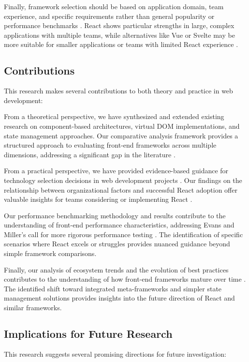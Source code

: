 Finally, framework selection should be based on application domain, team experience, and specific requirements rather than general popularity or performance benchmarks \cite{gartner2022}. React shows particular strengths in large, complex applications with multiple teams, while alternatives like Vue or Svelte may be more suitable for smaller applications or teams with limited React experience \cite{hassan2019}.

\subsection{Contributions}
This research makes several contributions to both theory and practice in web development:

From a theoretical perspective, we have synthesized and extended existing research on component-based architectures, virtual DOM implementations, and state management approaches. Our comparative analysis framework provides a structured approach to evaluating front-end frameworks across multiple dimensions, addressing a significant gap in the literature \cite{lee2022}.

From a practical perspective, we have provided evidence-based guidance for technology selection decisions in web development projects \cite{gartner2022}. Our findings on the relationship between organizational factors and successful React adoption offer valuable insights for teams considering or implementing React \cite{singh2021}.

Our performance benchmarking methodology and results contribute to the understanding of front-end performance characteristics, addressing Evans and Miller's call for more rigorous performance testing \cite{evans2022}. The identification of specific scenarios where React excels or struggles provides nuanced guidance beyond simple framework comparisons.

Finally, our analysis of ecosystem trends and the evolution of best practices contributes to the understanding of how front-end frameworks mature over time \cite{zhang2022}. The identified shift toward integrated meta-frameworks and simpler state management solutions provides insights into the future direction of React and similar frameworks.

\subsection{Implications for Future Research}
This research suggests several promising directions for future investigation:

